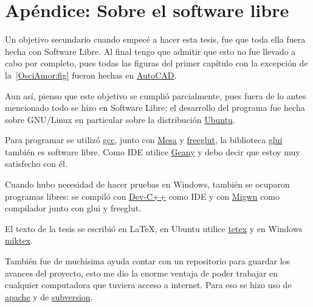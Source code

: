 \chapter*{Apéndice: Sobre el software libre}
Un objetivo secundario cuando empecé a hacer esta tesis, fue que toda ella fuera hecha con Software Libre. Al final tengo que admitir que esto no fue llevado a cabo por completo, pues todas las figuras del primer capítulo con la excepción de la~\ref{OsciAmor:fig} fueron hechas en \href{http://www.autodesk.es}{AutoCAD}.

Aun así, pienso que este objetivo se cumplió parcialmente, pues fuera de lo antes mencionado todo se hizo en Software Libre; el desarrollo del programa fue hecha sobre GNU/Linux en particular sobre la distribución \href{www.ubuntu.com}{Ubuntu}.

Para programar se utilizó \href{http://gcc.gnu.org/}{gcc}, junto con \href{http://www.mesa3d.org/}{Mesa} y \href{http://freeglut.sourceforge.net/}{freeglut}, la biblioteca \href{http://www.cs.unc.edu/rademach/glui/}{glui} también es software libre. Como IDE utilice \href{http://geany.uvena.de/}{Geany} y debo decir que estoy muy satisfecho con él.

Cuando hubo necesidad de hacer pruebas en Windows, también se ocuparon programas libres: se compiló con \href{http://www.bloodshed.net/devcpp.html}{Dev-C++} como IDE y con \href{http://www.mingw.org/}{Migwn} como compilador junto con glui y freeglut.

El texto de la tesis se escribió en \LaTeX, en Ubuntu utilice \href{http://web.bilkent.edu.tr/History/valley/tetex-index.html}{tetex} y en Windows \href{http://miktex.org/}{miktex}.

También fue de muchísima ayuda contar con un repositorio para guardar los avances del proyecto, esto me dio la enorme ventaja de poder trabajar en cualquier computadora que tuviera acceso a internet. Para eso se hizo uso de \href{http://www.apache.org/}{apache} y de \href{http://subversion.tigris.org/}{subversion}.
